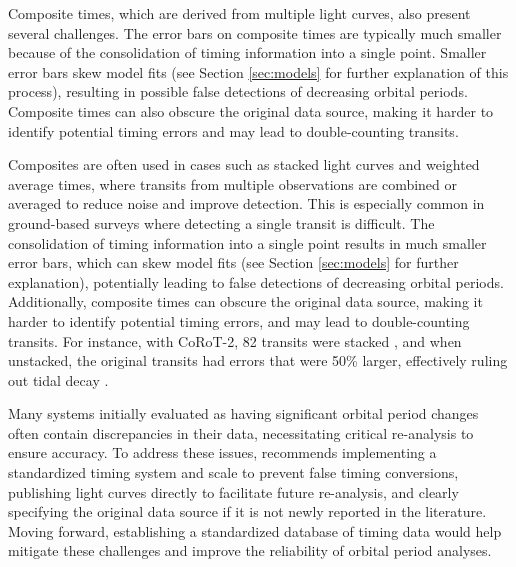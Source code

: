 \documentclass[oneside,12pt]{amsart}
\numberwithin{page}{section}
\begin{document}
Composite times, which are derived from multiple light curves, also present several challenges. The error bars on composite times are typically much smaller because of the consolidation of timing information into a single point. Smaller error bars skew model fits (see Section \ref{sec:models} for further explanation of this process), resulting in possible false detections of decreasing orbital periods. Composite times can also obscure the original data source, making it harder to identify potential timing errors and may lead to double-counting transits.

Composites are often used in cases such as stacked light curves and weighted average times, where transits from multiple observations are combined or averaged to reduce noise and improve detection. This is especially common in ground-based surveys where detecting a single transit is difficult. The consolidation of timing information into a single point results in much smaller error bars, which can skew model fits (see Section \ref{sec:models} for further explanation), potentially leading to false detections of decreasing orbital periods. Additionally, composite times can obscure the original data source, making it harder to identify potential timing errors, and may lead to double-counting transits. For instance, with CoRoT-2, 82 transits were stacked \citep{alonso2008transiting}, and when unstacked, the original transits had errors that were 50\% larger, effectively ruling out tidal decay \citep{adams2024doomed}.

Many systems initially evaluated as having significant orbital period changes often contain discrepancies in their data, necessitating critical re-analysis to ensure accuracy. To address these issues, \citet{adams2024doomed} recommends implementing a standardized timing system and scale to prevent false timing conversions, publishing light curves directly to facilitate future re-analysis, and clearly specifying the original data source if it is not newly reported in the literature. Moving forward, establishing a standardized database of timing data would help mitigate these challenges and improve the reliability of orbital period analyses.

\end{document}
